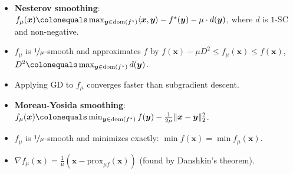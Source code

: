 \documentclass[8pt,a4paper]{extarticle}
\renewcommand{\vec}[1]{\bm{#1}}
\newcommand{\dom}[1]{\mathrm{dom}(#1)}
\newenvironment{topic}[1]
{\textbf{\sffamily \colorbox{black}{\rlap{\textbf{\textcolor{white}{#1}}}\hspace{\linewidth}\hspace{-2\fboxsep}}} \\ \vspace{0.2cm}}
{}
\begin{document}
\begin{multicols*}{2}
    \begin{topic}{Smoothing}
        \begin{itemize}
            \item \textbf{Nesterov smoothing}: $f_{\mu}(\vec{x}) \colonequals \max_{\vec{y} \in \dom{f^\star}} \langle \vec{x}, \vec{y} \rangle - f^\star(\vec{y}) - \mu \cdot d(\vec{y})$, where $d$ is $1$-SC and non-negative.
            \item $f_{\mu}$ is $\nicefrac{1}{\mu}$-smooth and approximates $f$ by $f(\vec{x}) - \mu D^2 \leq f_{\mu}(\vec{x}) \leq f(\vec{x})$, $D^2 \colonequals \max_{\vec{y} \in \dom{f^\star}} d(\vec{y})$.
            \item Applying GD to $f_{\mu}$ converges faster than subgradient descent.
            \item \textbf{Moreau-Yosida smoothing}: $f_{\mu}(\vec{x}) \colonequals \min_{\vec{y} \in \dom{f^\star}} f(\vec{y}) - \frac{1}{2 \mu} \| \vec{x} - \vec{y} \|_2^2$.
            \item $f_{\mu}$ is $\nicefrac{1}{\mu}$-smooth and minimizes exactly: $\min f(\vec{x}) = \min f_{\mu}(\vec{x})$.
            \item $\nabla f_{\mu}(\vec{x}) = \frac{1}{\mu}(\vec{x} - \mathrm{prox}_{\mu f}(\vec{x}))$ (found by Danshkin's theorem).
        \end{itemize}
    \end{topic}


\end{multicols*}
\end{document}
